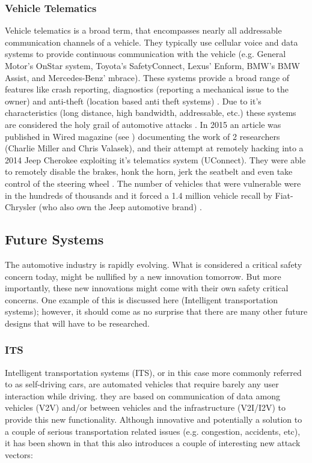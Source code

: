 \subsubsection{Vehicle Telematics} 
\label{subsubsec:telematics}

Vehicle telematics is a broad term, that encompasses nearly all addressable communication channels of a vehicle. They typically use cellular voice and data systems to provide continuous communication with the vehicle (e.g. General Motor's OnStar system, Toyota's SafetyConnect, Lexus' Enform, BMW's BMW Assist, and Mercedes-Benz' mbrace). These systems provide a broad range of features like crash reporting, diagnostics (reporting a mechanical issue to the owner) and anti-theft (location based anti theft systems) \cite{Kosher}. Due to it's characteristics (long distance, high bandwidth, addressable, etc.) these systems are considered the holy grail of automotive attacks \cite{MillerA}. In 2015 an article was published in Wired magazine (see \cite{Wired}) documenting the work of 2 researchers (Charlie Miller and Chris Valasek), and their attempt at remotely hacking into a 2014 Jeep Cherokee exploiting it's telematics system (UConnect). They were able to remotely disable the brakes, honk the horn, jerk the seatbelt and even take control of the steering wheel \cite{Wired}. The number of vehicles that were vulnerable were in the hundreds of thousands and it forced a 1.4 million vehicle recall by Fiat-Chrysler (who also own the Jeep automotive brand) \cite{MillerD}.

\subsection{Future Systems}
\label{subsec:future_systems}

The automotive industry is rapidly evolving. What is considered a critical safety concern today, might be nullified by a new innovation tomorrow. But more importantly, these new innovations might come with their own safety critical concerns. One example of this is discussed here (Intelligent transportation systems); however, it should come as no surprise that there are many other future designs that will have to be researched.

\subsubsection{ITS} 
\label{subsubsec:its}

Intelligent transportation systems (ITS), or in this case more commonly referred to as self-driving cars, are automated vehicles that require barely any user interaction while driving. they are based on communication of data among vehicles (V2V) and/or between vehicles and the infrastructure (V2I/I2V) to provide this new functionality. Although innovative and potentially a solution to a couple of serious transportation related issues (e.g. congestion, accidents, etc), it has been shown in \cite{Petit} that this also introduces a couple of interesting new attack vectors:   

